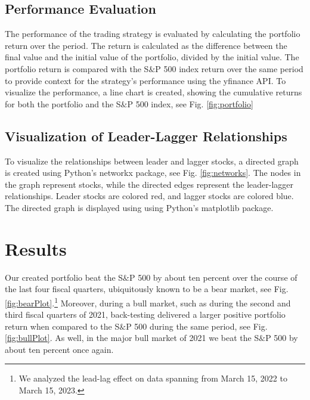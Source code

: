 \documentclass{article}
\begin{document}
\subsection{Performance Evaluation}
The performance of the trading strategy is evaluated by calculating the portfolio return over the period. The return is calculated as the difference between the final value and the initial value of the portfolio, divided by the initial value. The portfolio return is compared with the S$\&$P 500 index return over the same period to provide context for the strategy's performance using the {\selectfont
yfinance} API. To visualize the performance, a line chart is created, showing the cumulative returns for both the portfolio and the S$\&$P 500 index, see Fig. \ref{fig:portfolio}
\subsection{Visualization of Leader-Lagger Relationships}
To visualize the relationships between leader and lagger stocks, a directed graph is created using Python's {\selectfont
networkx} package, see Fig. \ref{fig:networks}. The nodes in the graph represent stocks, while the directed edges represent the leader-lagger relationships. Leader stocks are colored red, and lagger stocks are colored blue. The directed graph is displayed using using Python's {\selectfont
matplotlib} package.
\section{Results}
Our created portfolio beat the S$\&$P 500 by about ten percent over the course of the last four fiscal quarters, ubiquitously known to be a bear market, see Fig. \ref{fig:bearPlot}.\footnote{We analyzed the lead-lag effect on data spanning from March 15, 2022 to March 15, 2023.} Moreover, during a bull market, such as during the second and third fiscal quarters of 2021, back-testing delivered a larger positive portfolio return when compared to the S$\&$P 500 during the same period, see Fig. \ref{fig:bullPlot}. As well, in the major bull market of 2021 we beat the S$\&$P 500 by about ten percent once again.
\end{document}
